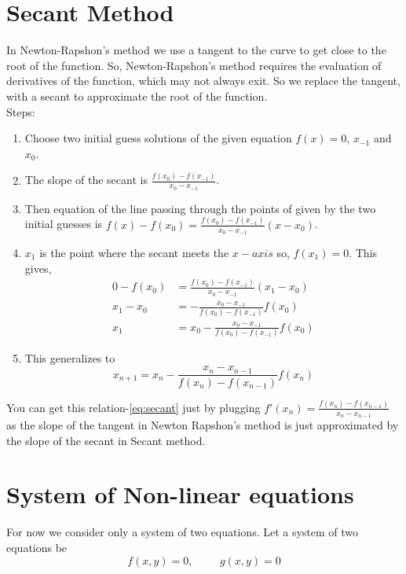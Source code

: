 \documentclass[aima203_lecturenotes_ku.tex]{subfiles}
\begin{document}
\section{Secant Method}
In Newton-Rapshon's method we use a tangent to the curve to get close to the root of the function. So, Newton-Rapshon's method requires the evaluation of derivatives of the function, which may not always exit. So we replace the tangent, with a secant to approximate the root of the function. \\[2mm]
Steps:
\begin{enumerate}
\item Choose two initial guess solutions of the given equation \(f(x)=0\), \(x_{-1}\) and \(x_0\).

\item The slope of the secant is \(\displaystyle \frac{f(x_0)-f(x_{-1})}{x_0 - x_{-1}}\).

\item  Then equation of the line passing through the points of given by the two initial guesses is \(\displaystyle f(x)-f(x_0)= \frac{f(x_0)-f(x_{-1})}{x_0 - x_{-1}} (x - x_0) \).

\item $x_1$ is the point where the secant meets the $x-axis$ so, $f(x_1)=0$. This gives,
  \begin{align*}
    0-f(x_0) &= \frac{f(x_0)-f(x_{-1})}{x_0 - x_{-1}} (x_1 - x_0) \\
    x_1 -x_0 &= - \frac{x_0 - x_{-1}}{f(x_0)-f(x_{-1})} f(x_0) \\
    x_1 &= x_0 - \frac{x_0 - x_{-1}}{f(x_0)-f(x_{-1})} f(x_0)
  \end{align*}

\item This generalizes to
  \begin{equation}
    \label{eq:secant}
    x_{n+1} = x_n - \frac{x_n - x_{n-1}}{f(x_n)-f(x_{n-1})} f(x_n)
  \end{equation}
\end{enumerate}
You can get this relation-\ref{eq:secant} just by plugging $f'(x_n)=\frac{f(x_n)-f(x_{n-1})}{x_n - x_{n-1}}$ as the slope of the tangent in Newton Rapshon's method is just approximated by the slope of the secant in Secant method.

\section{System of Non-linear equations}
For now we consider only a system of two equations. Let a system of two equations be
\begin{equation}
  \label{system}
  f(x,y)=0, \hspace{1cm} g(x,y)=0
\end{equation}
\end{document}
